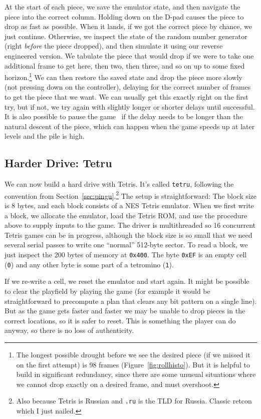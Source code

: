 \documentclass[twocolumn]{article}
\begin{document}
At the start of each piece, we save the emulator state, and then
navigate the piece into the correct column. Holding down on the D-pad
causes the piece to drop as fast as possible. When it lands, if we got
the correct piece by chance, we just continue. Otherwise, we inspect
the state of the random number generator (right {\em before} the piece
dropped), and then simulate it using our reverse engineered version.
We tabulate the piece that would drop if we were to take one
additional frame to get here, then two, then three, and so on up to
some fixed horizon.\footnote{The longest possible drought before we
  see the desired piece (if we missed it on the first attempt) is 98
  frames (Figure~\ref{fig:rollhisto}). But it is helpful to build in
  significant redundancy, since there are some unusual situations
  where we cannot drop exactly on a desired frame, and must
  overshoot.} We can then restore the saved state and drop the piece
more slowly (not pressing down on the controller), delaying for the
correct number of frames to get the piece that we want. We can usually
get this exactly right on the first try, but if not, we try again with
slightly longer or shorter delays until successful. It is also
possible to pause the game~\cite{murphy2013first} if the delay needs
to be longer than the natural descent of the piece, which can happen
when the game speeds up at later levels and the pile is high.

\subsection{Harder Drive: Tetru}

We can now build a hard drive with Tetris. It's called {\tt tetru},
following the convention from Section~\ref{sec:pingu}.\footnote{Also
  because Tetris is Russian and {\tt .ru} is the TLD for Russia.
  Classic retcon which I just nailed.} The setup is straightforward:
The block size is 8 bytes, and each block consists of a NES Tetris
emulator. When we first write a block, we allocate the emulator, load
the Tetris ROM, and use the procedure above to supply inputs to the
game. The driver is multithreaded so 16 concurrent Tetris games can be
in progress, although the block size is so small that we need several
serial passes to write one ``normal'' 512-byte sector. To read a
block, we just inspect the 200 bytes of memory at {\tt 0x400}.
The byte {\tt 0xEF} is an empty cell ({\tt 0}) and any other byte is some
part of a tetromino ({\tt 1}).

If we re-write a cell, we reset the emulator and start again. It might
be possible to clear the playfield by playing the game (for example it
would be straightforward to precompute a plan that clears any bit
pattern on a single line). But as the game gets faster and faster we
may be unable to drop pieces in the correct locations, so it is safer
to reset. This is something the player can do anyway, so there is no
loss of authenticity.
\end{document}
